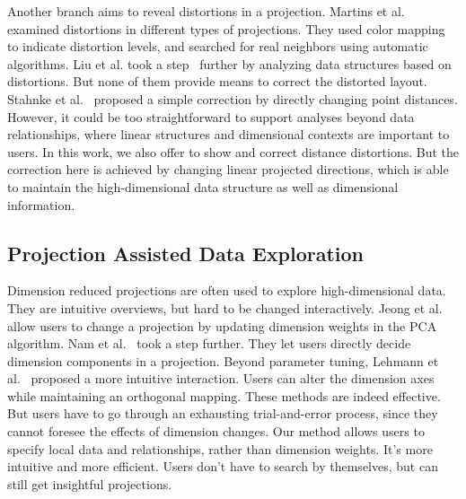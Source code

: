 Another branch aims to reveal distortions in a projection. Martins et al.~\cite{DBLP:journals/cg/MartinsCMT14} examined distortions in different types of projections. They used color mapping to indicate distortion levels, and searched for real neighbors using automatic algorithms. Liu et al. took a step~\cite{DBLP:journals/cgf/LiuWBP14} further by analyzing data structures based on distortions. But none of them provide means to correct the distorted layout. Stahnke et al.~\cite{DBLP:journals/tvcg/StahnkeDMT16} proposed a simple correction by directly changing point distances. However, it could be too straightforward to support analyses beyond data relationships, where linear structures and dimensional contexts are important to users. In this work, we also offer to show and correct distance distortions. But the correction here is achieved by changing linear projected directions, which is able to maintain the high-dimensional data structure as well as dimensional information.

\subsection{Projection Assisted Data Exploration}
Dimension reduced projections are often used to explore high-dimensional data. They are intuitive overviews, but hard to be changed interactively. Jeong et al.~\cite{DBLP:journals/cgf/JeongZFRC09} allow users to change a projection by updating dimension weights in the PCA algorithm. Nam et al.~\cite{DBLP:journals/tvcg/NamM13} took a step further. They let users directly decide dimension components in a projection. Beyond parameter tuning, Lehmann et al.~\cite{DBLP:journals/tvcg/LehmannT13} proposed a more intuitive interaction. Users can alter the dimension axes while maintaining an orthogonal mapping. These methods are indeed effective. But users have to go through an exhausting trial-and-error process, since they cannot foresee the effects of dimension changes. Our method allows users to specify local data and relationships, rather than dimension weights. It's more intuitive and more efficient. Users don't have to search by themselves, but can still get insightful projections.

